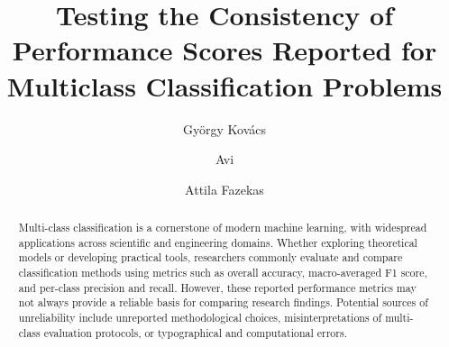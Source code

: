 \documentclass[3p, times]{elsarticle}
\begin{document}
\begin{frontmatter}




\title{Testing the Consistency of Performance Scores Reported for Multiclass Classification Problems}


\author[1]{Gy\"orgy Kov\'acs}

\author[2]{Avi}

\author[3]{Attila Fazekas} 






\begin{abstract}
Multi-class classification is a cornerstone of modern machine learning, with widespread applications across scientific and engineering domains. Whether exploring theoretical models or developing practical tools, researchers commonly evaluate and compare classification methods using metrics such as overall accuracy, macro-averaged F1 score, and per-class precision and recall. However, these reported performance metrics may not always provide a reliable basis for comparing research findings. Potential sources of unreliability include unreported methodological choices, misinterpretations of multi-class evaluation protocols, or typographical and computational errors.


\end{abstract}
\end{frontmatter}
\end{document}
